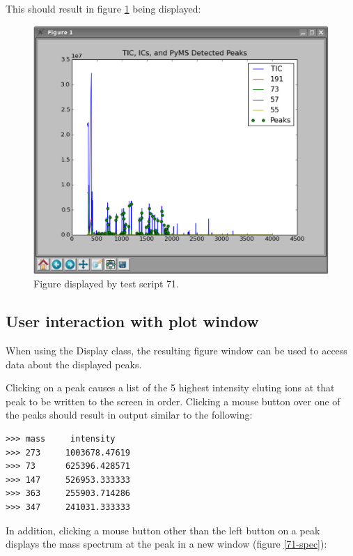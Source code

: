 This should result in figure \ref{71-ics} being displayed:

\begin{figure}
  \begin{center}
    \includegraphics[scale=0.33]{graphics/chapter07/test-71-ICs.eps}
  \end{center}
  \caption{Figure displayed by test script 71.}
  \label{71-ics}
\end{figure}


\subsection{User interaction with plot window}

When using the Display class, the resulting figure window can be used to
access data about the displayed peaks.

Clicking on a peak causes a list of the 5 highest intensity eluting ions at that
peak to be written to the screen in order.
Clicking a mouse button over one of the 
peaks should result in output similar to the following:

\begin{verbatim}
>>> mass     intensity
>>> 273     1003678.47619
>>> 73      625396.428571
>>> 147     526953.333333
>>> 363     255903.714286
>>> 347     241031.333333
\end{verbatim}

In addition, clicking a mouse button other than the left button on a peak displays the 
mass spectrum at the peak in a new window (figure \ref{71-spec}):

